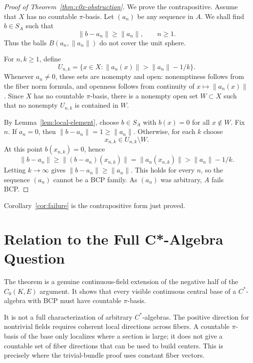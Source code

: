 \documentclass[11pt]{article}
\begin{document}
\begin{proof}[Proof of Theorem~\ref{thm:c0x-obstruction}]
We prove the contrapositive.  Assume that \(X\) has no countable
\(\pi\)-basis.  Let \((a_n)\) be any sequence in \(A\).  We shall find
\(b\in S_A\) such that
\[
        \|b-a_n\|\ge \|a_n\|,\qquad n\ge1.
\]
Thus the balls \(B(a_n,\|a_n\|)\) do not cover the unit sphere.

For \(n,k\ge1\), define
\[
        U_{n,k}
        =
        \{x\in X:\|a_n(x)\|>\|a_n\|-1/k\}.
\]
Whenever \(a_n\ne0\), these sets are nonempty and open: nonemptiness follows
from the fiber norm formula, and openness follows from continuity of
\(x\mapsto\|a_n(x)\|\).  Since \(X\) has no countable \(\pi\)-basis, there is
a nonempty open set \(W\subset X\) such that no nonempty \(U_{n,k}\) is
contained in \(W\).

By Lemma~\ref{lem:local-element}, choose \(b\in S_A\) with \(b(x)=0\) for
all \(x\notin W\).  Fix \(n\).  If \(a_n=0\), then
\(\|b-a_n\|=1\ge \|a_n\|\).  Otherwise, for each \(k\) choose
\[
        x_{n,k}\in U_{n,k}\setminus W.
\]
At this point \(b(x_{n,k})=0\), hence
\[
        \|b-a_n\|
        \ge
        \|(b-a_n)(x_{n,k})\|
        =
        \|a_n(x_{n,k})\|
        >
        \|a_n\|-1/k .
\]
Letting \(k\to\infty\) gives \(\|b-a_n\|\ge \|a_n\|\).  This holds for every
\(n\), so the sequence \((a_n)\) cannot be a BCP family.  As \((a_n)\) was
arbitrary, \(A\) fails BCP.
\end{proof}

Corollary~\ref{cor:failure} is the contrapositive form just proved.

\section*{Relation to the Full C*-Algebra Question}

The theorem is a genuine continuous-field extension of the negative half of
the \(C_0(K,E)\) argument.  It shows that every visible continuous central base
of a \(C^*\)-algebra with BCP must have countable \(\pi\)-basis.

It is not a full characterization of arbitrary \(C^*\)-algebras.  The positive
direction for nontrivial fields requires coherent local directions across
fibers.  A countable \(\pi\)-basis of the base only localizes where a section
is large; it does not give a countable set of fiber directions that can be
used to build centers.  This is precisely where the trivial-bundle proof uses
constant fiber vectors.
\end{document}
